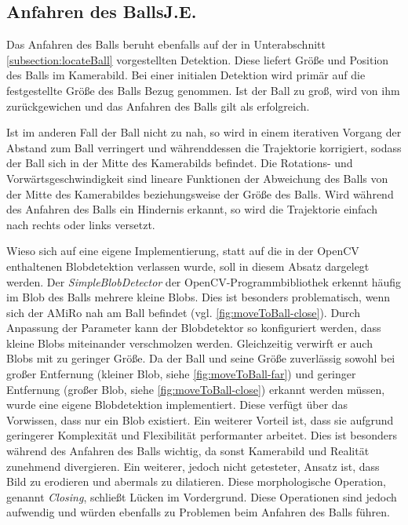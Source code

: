 \subsection[Anfahren des Balls]{Anfahren des Balls\hfill {\normalsize J.E.}} %
\label{subsection:moveToBall}

Das Anfahren des Balls beruht ebenfalls auf der in Unterabschnitt \ref{subsection:locateBall} vorgestellten Detektion. Diese liefert Größe und Position des Balls im Kamerabild. Bei einer initialen Detektion wird primär auf die festgestellte Größe des Balls Bezug genommen. Ist der Ball zu groß, wird von ihm zurückgewichen und das Anfahren des Balls gilt als erfolgreich.

Ist im anderen Fall der Ball nicht zu nah, so wird in einem iterativen Vorgang der Abstand zum Ball verringert und währenddessen die Trajektorie korrigiert, sodass der Ball sich in der Mitte des Kamerabilds befindet. Die Rotations- und Vorwärtsgeschwindigkeit sind lineare Funktionen der Abweichung des Balls von der Mitte des Kamerabildes beziehungsweise der Größe des Balls.
Wird während des Anfahren des Balls ein Hindernis erkannt, so wird die Trajektorie einfach nach rechts oder links versetzt.

Wieso sich auf eine eigene Implementierung, statt auf die in der OpenCV enthaltenen Blobdetektion verlassen wurde, soll in diesem Absatz dargelegt werden.
Der \textit{SimpleBlobDetector} der OpenCV-Programmbibliothek erkennt häufig im Blob des Balls mehrere kleine Blobs. Dies ist besonders problematisch, wenn sich der AMiRo nah am Ball befindet (vgl. \ref{fig:moveToBall-close}).
Durch Anpassung der Parameter kann der Blobdetektor so konfiguriert werden, dass kleine Blobs miteinander verschmolzen werden.
Gleichzeitig verwirft er auch Blobs mit zu geringer Größe. Da der Ball und seine Größe zuverlässig sowohl bei großer Entfernung (kleiner Blob, siehe \ref{fig:moveToBall-far}) und geringer Entfernung (großer Blob, siehe \ref{fig:moveToBall-close}) erkannt werden müssen, wurde eine eigene Blobdetektion implementiert. Diese verfügt über das Vorwissen, dass nur ein Blob existiert. Ein weiterer Vorteil ist, dass sie aufgrund geringerer Komplexität und Flexibilität performanter arbeitet. Dies ist besonders während des Anfahren des Balls wichtig, da sonst Kamerabild und Realität zunehmend divergieren.
Ein weiterer, jedoch nicht getesteter, Ansatz ist, dass Bild zu erodieren und abermals zu dilatieren. Diese morphologische Operation, genannt \textit{Closing}, schließt Lücken im Vordergrund. Diese Operationen sind jedoch aufwendig und würden ebenfalls zu Problemen beim Anfahren des Balls führen.

